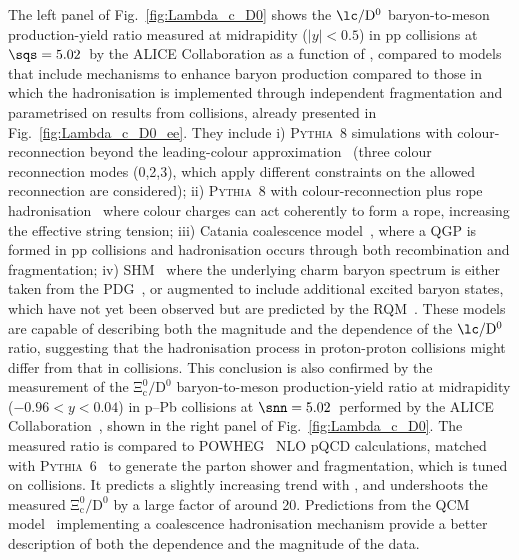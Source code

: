 The left panel of Fig.~\ref{fig:Lambda_c_D0} shows the $\mathrm{\lc/D^0}$ baryon-to-meson production-yield ratio measured at midrapidity ($\lvert y\rvert < 0.5$) in pp collisions at $\sqs = 5.02$~\tev by the ALICE Collaboration as a function of \pt, compared to models that include mechanisms to enhance baryon production compared to those in which the hadronisation is implemented through independent fragmentation and parametrised on results from \ee collisions, already presented in Fig.~\ref{fig:Lambda_c_D0_ee}. They include i) \textsc{Pythia}~8 simulations with colour-reconnection beyond the leading-colour approximation~\cite{Christiansen:2015yqa} (three colour reconnection modes (0,2,3), which apply different constraints on the allowed reconnection are considered); ii) \textsc{Pythia}~8 with colour-reconnection plus rope hadronisation~\cite{Bierlich:2014xba} where colour charges can act coherently to form a rope, increasing the effective string tension; iii) Catania coalescence model~\cite{Minissale:2020bif}, where a QGP is formed in pp collisions and hadronisation occurs through both recombination and fragmentation; iv) SHM~\cite{Braun-Munzinger:2003pwq} where the underlying charm baryon spectrum is either taken from the PDG~\cite{pdg}, or augmented to include additional excited baryon states, which have not yet been observed but are predicted by the RQM~\cite{Ebert:2011kk}. These models are capable of describing both the magnitude and the \pt dependence of the $\mathrm{\lc/D^0}$ ratio, suggesting that the hadronisation process in proton-proton collisions might differ from that in \ee collisions. This conclusion is also confirmed by the measurement of the $\mathrm{\Xi_c^0/D^0}$ baryon-to-meson production-yield ratio at midrapidity ($-0.96<y<0.04$) in p--Pb collisions at $\snn = 5.02$~\tev performed by the ALICE Collaboration~\cite{ALICE:2024ozd}, shown in the right panel of Fig.~\ref{fig:Lambda_c_D0}. The measured ratio is compared to POWHEG~\cite{Frixione:2007nw} NLO pQCD calculations, matched with \textsc{Pythia}~6~\cite{Sjostrand:2006za} to generate the parton shower and fragmentation, which is tuned on \ee collisions. It predicts a slightly increasing trend with \pt, and undershoots the measured $\mathrm{\Xi_c^0/D^0}$ by a large factor of around 20. Predictions from the QCM model~\cite{Song:2018tpv} implementing a coalescence hadronisation mechanism provide a better description of both the \pt dependence and the magnitude of the data. 

